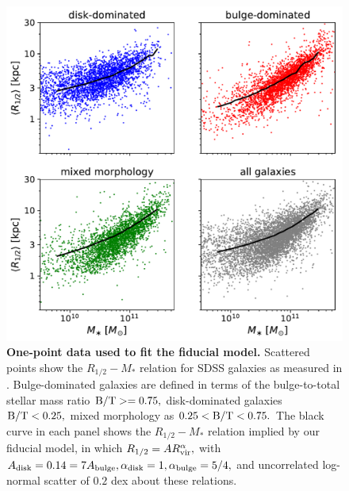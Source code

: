 \documentclass[usenatbib,usegraphicx,letterpaper]{mn2e}
\newcommand{\rhalf}{R_{1/2}}
\newcommand{\adisk}{A_{\rm disk}}
\newcommand{\abulge}{A_{\rm bulge}}
\newcommand{\alphadisk}{\alpha_{\rm disk}}
\newcommand{\alphabulge}{\alpha_{\rm bulge}}
\newcommand{\rvir}{R_{\rm vir}}
\newcommand{\bt}{{\rm B/T}}
\newcommand{\mstar}{M_{\ast}}
\begin{document}
\begin{figure}
\centering
\includegraphics[width=12cm]{FIGS/size_vs_stellar_mass_multipanel_bt_decomposition.pdf}
\caption{
{\bf One-point data used to fit the fiducial model.}
Scattered points show the $\rhalf-\mstar$ relation for SDSS galaxies as measured in \citet{meert_etal15}. Bulge-dominated galaxies are defined in terms of the bulge-to-total stellar mass ratio $\bt>=0.75,$ disk-dominated galaxies $\bt<0.25,$ mixed morphology as $0.25 < \bt < 0.75.$ The black curve in each panel shows the $\rhalf-\mstar$ relation implied by our fiducial model, in which $\rhalf=A\rvir^\alpha,$ with $\adisk=0.14=7\abulge, \alphadisk=1, \alphabulge=5/4,$ and uncorrelated log-normal scatter of $0.2$ dex about these relations. 
}
\label{fig:scatter_plot}
\end{figure}
\end{document}
